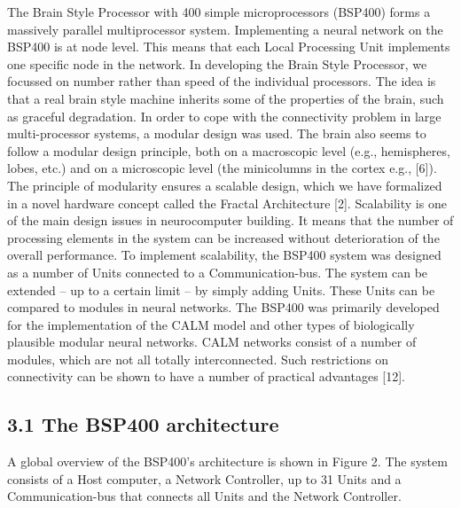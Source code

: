 \documentclass[11pt, a4paper]{article}
\begin{document}
The Brain Style Processor with 400 simple microprocessors (BSP400) forms a massively parallel multiprocessor system. Implementing a neural network on the BSP400 is at node level. This means that each Local Processing Unit implements one specific node in the network. In developing the Brain Style Processor, we focussed on number rather than speed of the individual processors. The idea is that a real brain style machine inherits some of the properties of the brain, such as graceful degradation. In order to cope with the connectivity problem in large multi-processor systems, a modular design was used. The brain also seems to follow a modular design principle, both on a macroscopic level (e.g., hemispheres, lobes, etc.) and on a microscopic level (the minicolumns in the cortex e.g., [6]). The principle of modularity ensures a scalable design, which we have formalized in a novel hardware concept called the Fractal Architecture [2]. Scalability is one of the main design issues in neurocomputer building. It means that the number of processing elements in the system can be increased without deterioration of the overall performance. To implement scalability, the BSP400 system was designed as a number of Units connected to a Communication-bus. The system can be extended -- up to a certain limit -- by simply adding Units. These Units can be compared to modules in neural networks. The BSP400 was primarily developed for the implementation of the CALM model and other types of biologically plausible modular neural networks. CALM networks consist of a number of modules, which are not all totally interconnected. Such restrictions on connectivity can be shown to have a number of practical advantages [12].

\subsection*{\color{navyaccent} 3.1 The BSP400 architecture}

A global overview of the BSP400's architecture is shown in Figure 2. The system consists of a Host computer, a Network Controller, up to 31 Units and a Communication-bus that connects all Units and the Network Controller.
\end{document}
